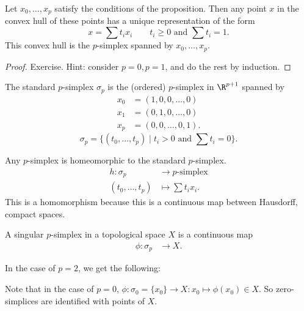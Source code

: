 \begin{prop}
    Let $x_0, \ldots, x_p$ satisfy the conditions of the proposition.
    Then any point $x$ in the convex hull of these points has a unique representation of the form
    \[
    x = \sum t_i x_i \qquad  t_i \ge  0 \text{ and } \sum t_i = 1
    .\]
    This convex hull is the $p$-simplex spanned by $x_0, \ldots, x_p$.
\end{prop}
\begin{proof}
    Exercise. Hint: consider $p = 0, p = 1$, and do the rest by induction.
\end{proof}
\begin{definition}
    The standard $p$-simplex $\sigma_p$ is the (ordered) $p$-simplex in $\R^{p+1}$ spanned by
    \begin{align*}
        x_0 &= (1, 0, 0, \ldots, 0)\\
        x_1 &= (0, 1, 0, \ldots, 0)\\
        x_p &= (0, 0, \ldots, 0, 1)
    .\end{align*}
    \[
        \sigma_p = \{(t_0, \ldots, t_p)  \mid  t_i>0 \text{ and }\sum t_i = 0 \}
    .\]
\end{definition}
\begin{remark}
    Any $p$-simplex is homeomorphic to the standard $p$-simplex.
    \begin{align*}
        h: \sigma_p &\longrightarrow \text{$p$-simplex} \\
        (t_0, \ldots, t_p) &\longmapsto \sum t_i x_i
    .\end{align*}
    This is a homomorphism because this is a continuous map between Hausdorff, compact spaces.
\end{remark}
\begin{definition}
    A singular $p$-simplex in a topological space $X$ is a continuous map
    \begin{align*}
        \phi: \sigma_p &\longrightarrow X
    .\end{align*}
\end{definition}
In the case of $p=2$, we get the following:
\begin{figure}[H]
    \centering
    \label{fig:definition-singular-p-simplex}
\end{figure}

Note that in the case of $p=0$,  $\phi:\sigma_0 = \{x_0\} \to  X: x_0 \mapsto  \phi(x_0) \in X$.
So zero-simplices are identified with points of $X$.

